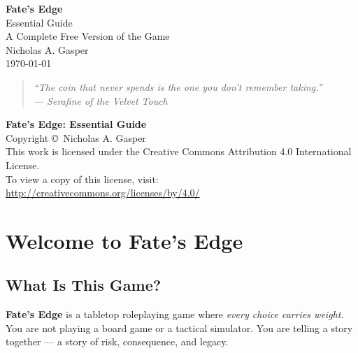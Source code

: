 \documentclass[11pt]{book}
\begin{document}


\frontmatter
\thispagestyle{empty}
\begin{center}
  \vspace*{1in}
  {\Huge \textbf{Fate's Edge}}\\[0.5in]
  {\LARGE Essential Guide}\\[0.5in]
  {\Large A Complete Free Version of the Game}\\[0.2in]
  {\large Nicholas A. Gasper}\\[0.2in]
  {\large \today}\\[1in]
  \begin{quote}
    \itshape
    ``The coin that never spends is the one you don't remember taking.''\\
    --- Serafine of the Velvet Touch
  \end{quote}
  \vfill
\end{center}
\clearpage

\thispagestyle{empty}
\begin{center}
  \vspace*{2in}
  \textbf{Fate's Edge: Essential Guide}\\[0.2in]
  Copyright \copyright\ Nicholas A. Gasper\\[0.2in]
  This work is licensed under the Creative Commons Attribution 4.0 International License.\\
  To view a copy of this license, visit:\\
  \url{http://creativecommons.org/licenses/by/4.0/}
\end{center}
\clearpage

\tableofcontents
\clearpage

\mainmatter

\chapter{Welcome to Fate's Edge}
\label{ch:welcome}

\section{What Is This Game?}

\textbf{Fate's Edge} is a tabletop roleplaying game where \emph{every choice carries weight}. You are not playing a board game or a tactical simulator. You are telling a story together --- a story of risk, consequence, and legacy.
\end{document}

